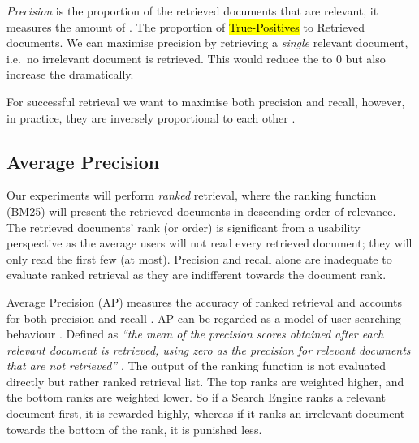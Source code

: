 \textit{Precision} is the proportion of the retrieved documents that are relevant, it measures the amount of . The proportion of \hl{True-Positives} to Retrieved documents. We can maximise precision by retrieving a \textit{single} relevant document, i.e.\ no irrelevant document is retrieved. This would reduce the  to 0 but also increase the  dramatically.

For successful retrieval we want to maximise both precision and recall, however, in practice, they are inversely proportional to each other \cite{shafi2005precision}.








\subsection{Average Precision}

Our experiments will perform \textit{ranked} retrieval, where the ranking function (BM25) will present the retrieved documents in descending order of relevance. The retrieved documents' rank (or order) is significant from a usability perspective as the average users will not read every retrieved document; they will only read the first few (at most). Precision and recall alone are inadequate to evaluate ranked retrieval as they are indifferent towards the document rank.

Average Precision (AP) measures the accuracy of ranked retrieval and accounts for both precision and recall \cite{su2015relationship}. AP can be regarded as a model of user searching behaviour \cite{robertson2008new}. Defined as\textit{ ``the mean of the precision scores obtained after each relevant document is retrieved, using zero as the precision for relevant documents that are not retrieved''} \cite{buckley2017evaluating}. The output of the ranking function is not evaluated directly but rather ranked retrieval list. The top ranks are weighted higher, and the bottom ranks are weighted lower. So if a Search Engine ranks a relevant document first, it is rewarded highly, whereas if it ranks an irrelevant document towards the bottom of the rank, it is punished less. 


